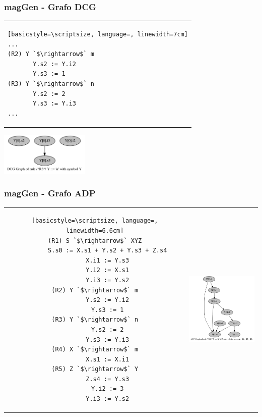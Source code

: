 \documentclass[10pt]{beamer}
\begin{document}
\begin{frame}[fragile]
    \frametitle{magGen - Grafo DCG}
\begin{center}        
\begin{tabular}{p{6cm}}
\begin{lstlisting}[basicstyle=\scriptsize, language=, linewidth=7cm]
...
(R2) Y `$\rightarrow$` m
       Y.s2 := Y.i2
       Y.s3 := 1
(R3) Y `$\rightarrow$` n
       Y.s2 := 2
       Y.s3 := Y.i3
...
\end{lstlisting}
\end{tabular}
\end{center}
\begin{center}\includegraphics[width=160px, height=77px]{./12_dcg_graph.png}\end{center}
\end{frame}

\begin{frame}[fragile]
    \frametitle{magGen - Grafo ADP}

\begin{tabular}{c p{4.5cm}}
\hspace{-0.5cm}\begin{lstlisting}[basicstyle=\scriptsize, language=, linewidth=6.6cm]
(R1) S `$\rightarrow$` XYZ
       S.s0 := X.s1 + Y.s2 + Y.s3 + Z.s4
       X.i1 := Y.s3
       Y.i2 := X.s1
       Y.i3 := Y.s2
(R2) Y `$\rightarrow$` m
       Y.s2 := Y.i2
       Y.s3 := 1
(R3) Y `$\rightarrow$` n
       Y.s2 := 2
       Y.s3 := Y.i3
(R4) X `$\rightarrow$` m
       X.s1 := X.i1
(R5) Z `$\rightarrow$` Y
       Z.s4 := Y.s3
       Y.i2 := 3
       Y.i3 := Y.s2
\end{lstlisting}
&\hspace{0.2cm}\parbox[c]{1em}{\includegraphics[width=149px, height=150px]{./15_adp_graph.png}}
\end{tabular}

\end{frame}
\end{document}
